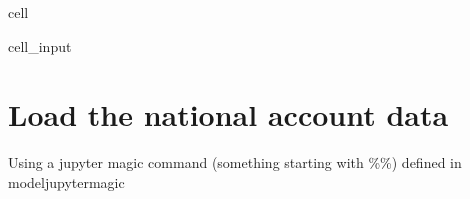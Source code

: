 \documentclass[letterpaper,10pt,english]{jupyterBook}
\begin{document}
\begin{sphinxuseclass}{cell}\begin{sphinxVerbatimInput}

\begin{sphinxuseclass}{cell_input}
\begin{sphinxVerbatim}[commandchars=\\\{\}]
   
\end{sphinxVerbatim}

\end{sphinxuseclass}\end{sphinxVerbatimInput}

\end{sphinxuseclass}

\section{Load the  national account data}
\label{\detokenize{content/howto/smallmodel/modelstart:load-the-national-account-data}}
\sphinxAtStartPar
Using a jupyter magic command (something starting with \%\%) defined in modeljupytermagic
\end{document}
